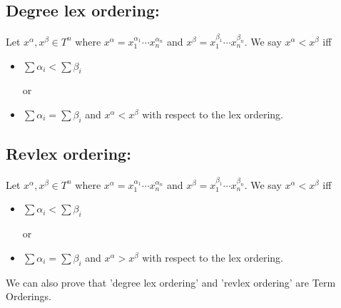 \subsection*{Degree lex ordering:}
Let $x^{\alpha},x^{\beta} \in T^{n}$ where
$x^{\alpha}=x_{1}^{\alpha_{1}}\cdots x_{n}^{\alpha_{n}}$ and $x^{\beta}=x_{1}^{\beta_{1}}\cdots x_{n}^{\beta_{n}}$. We say $x^{\alpha}<x^{\beta}$ iff 
\begin{itemize}
\item $\sum\alpha_{i}<\sum\beta_{i}$ 
\item [or]
\item $\sum\alpha_{i}=\sum\beta_{i}$ and $x^{\alpha}<x^{\beta}$ with respect to the lex ordering. 
\end{itemize}

\subsection*{Revlex ordering:}
Let $x^{\alpha},x^{\beta} \in T^{n}$ where
$x^{\alpha}=x_{1}^{\alpha_{1}}\cdots x_{n}^{\alpha_{n}}$ and $x^{\beta}=x_{1}^{\beta_{1}}\cdots x_{n}^{\beta_{n}}$. We say 
$x^{\alpha}<x^{\beta}$ iff
\begin{itemize}
\item $\sum\alpha_{i}<\sum\beta_{i}$ 
\item [or]
\item  $\sum\alpha_{i}=\sum\beta_{i}$ and $x^{\alpha}>x^{\beta}$ with respect to the lex ordering. 
\end{itemize}

We can also prove that 'degree lex ordering' and 'revlex ordering' are Term Orderings.
